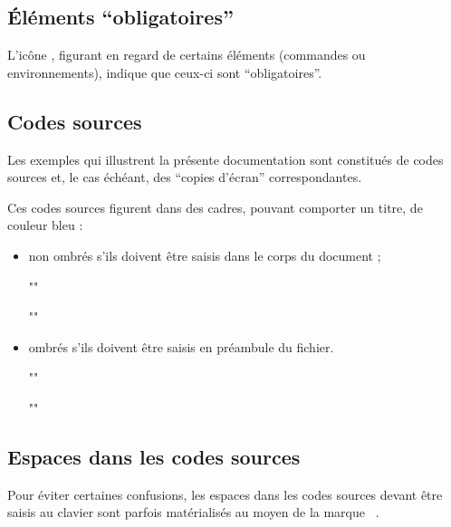 \documentclass[french,nolocaltoc]{nwejmart}
\newtheorem[style=definition]{fait}
\newtheorem[title=contraventionnalisation]{ctrv}
\newtheorem[title-plural=anneaux]{anneau}
\newtheorem[title-plural=idéaux]{idéal}
\begin{document}
\subsection{Éléments \enquote{obligatoires}}
\label{sec-comm-oblig}

L'icône \mandatory{}, figurant en regard de certains éléments (commandes ou
environnements), indique que ceux-ci sont \enquote{obligatoires}.

\subsection{Codes sources}
\label{sec-codes-sources}

Les exemples qui illustrent la présente documentation sont constitués de codes
sources et, le cas échéant, des \enquote{copies d'écran} correspondantes.

Ces codes sources figurent dans des cadres, pouvant comporter un titre, de
couleur bleu :
\begin{itemize}
\item non ombrés s'ils doivent être saisis dans le corps du document ;
\begin{bodycode}
""
\end{bodycode}
\begin{bodycode}[title=\meta{titre}]
""
\end{bodycode}
\item ombrés s'ils doivent être saisis en préambule du fichier.
\begin{preamblecode}
""
\end{preamblecode}
\begin{preamblecode}[title=\meta{titre}]
""
\end{preamblecode}
\end{itemize}

\subsection{Espaces dans les codes sources}
\label{sec-espaces-dans-les}

Pour éviter certaines confusions, les espaces dans les codes sources devant
être saisis au clavier sont parfois matérialisés au moyen de la marque
\lstinline[showspaces]+ +.
\end{document}
